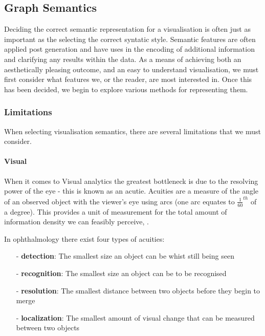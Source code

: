 

\subsection{Graph Semantics}\label{semantic}

Deciding the correct semantic representation for a visualisation is often just as important as the selecting the correct syntatic style. Semantic features are often applied post generation \cite{aestheticsgraphvis} and have uses in the encoding of additional information and clarifying any results within the data. As a means of achieving both an aesthetically pleasing outcome, and an easy to understand visualisation, we must first consider what features we, or the reader, are most interested in. Once this has been decided, we begin to explore various methods for representing them. 

\subsubsection{Limitations}

When selecting visualisation semantics, there are several limitations that we must consider. 

\paragraph*{Visual}
When it comes to Visual analytics the greatest bottleneck is due to the resolving power of the eye - this is known as an acutie. Acuities are a measure of the angle of an observed object with the viewer's eye using arcs (one arc equates to $\frac{1}{60}^{th}$ of a degree). This provides a unit of measurement for the total amount of information density we can feasibly perceive, \cite{ware}. 

 In ophthalmology there exist four types of  acuities: 
\begin{itemize}
\item[-] \textbf{detection}: The smallest size an object can be whist still being seen
\item[-] \textbf{recognition}: The smallest size an object can be to be recognised
\item[-] \textbf{resolution}: The smallest distance between two objects before they begin to merge
\item[-] \textbf{localization}: The smallest amount of visual change that can be measured between two objects
\end{itemize}

